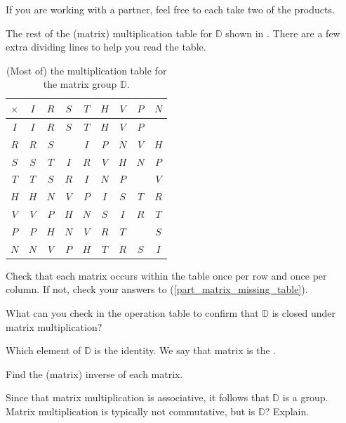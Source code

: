 \begin{act}
\begin{apart}
            If you are working with a partner, feel free to each take two of the products.       
            \item The rest of the (matrix) multiplication table for $\mathbb{D}$ shown in .  There are a few extra dividing lines to help you read the table.
                \begin{table}[hbtp]
                    \centering
                    \begin{tabular}{c|cccc |cccc}
                           $\times$  & $I$ & $R$ & $S$ & $T$ & $H$ & $V$ & $P$ & $N$  \\ \hline
                         $I$ & $I$ & $R$ & $S$ & $T$ & $H$ & $V$ & $P$ &   \\
                         $R$ & $R$ & $S$ &  & $I$ & $P$ & $N$ & $V$ & $H$  \\
                         $S$ & $S$ & $T$ & $I$  & $R$ & $V$ & $H$ & $N$ & $P$  \\
                         $T$ & $T$ & $S$ & $R$ & $I$ & $N$ & $P$ &  & $V$  \\ \hline
                         $H$ & $H$ & $N$ & $V$ & $P$ & $I$ & $S$ & $T$ & $R$  \\
                         $V$ & $V$ & $P$ & $H$ & $N$ & $S$ & $I$ & $R$ & $T$  \\
                         $P$ & $P$ & $H$ & $N$ & $V$ & $R$ & $T$ &  & $S$  \\
                         $N$ & $N$ & $V$ & $P$ & $H$ & $T$ & $R$ & $S$ & $I$  \\
                    \end{tabular}
                    \caption{(Most of) the multiplication table for the matrix group $\mathbb{D}$.}
                    \label{tab_mult_D8_matrices}
                \end{table}
                Check that each matrix occurs within the table once per row and once per column. If not, check your answers to (\ref{part_matrix_missing_table}).
            \item What can you check in the operation table to confirm that $\mathbb{D}$ is closed under matrix multiplication?
            \item Which element of $\mathbb{D}$ is the identity.   We say that matrix is the .
            \item Find the (matrix) inverse of each matrix. 
            \item Since that matrix multiplication is  associative, it follows that $\mathbb{D}$ is a group.  Matrix multiplication is typically not commutative, but is $\mathbb{D}$?  Explain.
        \end{apart}
\end{act}

